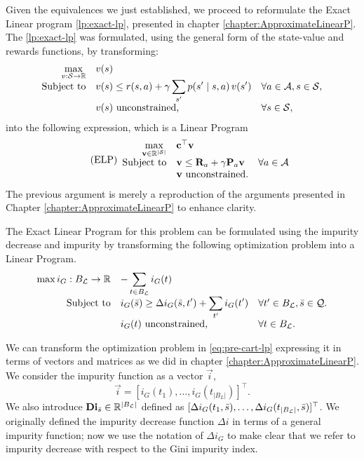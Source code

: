 Given the equivalences we just established, we proceed to reformulate the Exact
Linear program \eqref{lp:exact-lp}, presented in chapter
\ref{chapter:ApproximateLinearP}. The \eqref{lp:exact-lp} was formulated, using
the general form of the state-value and rewards functions, by transforming:
\begin{equation*}
\begin{array}{rl@{}ll}
    \displaystyle \max_{v: \States \to \R} & v(s) \\
    \text{Subject to} & \displaystyle v(s) \leq r(s,a) + \gamma \sum_{s'} p(s' \mid s, a) \, v(s') & \quad \forall a \in \Actions, s \in \States, \\
    & v(s) \text{ unconstrained,} & \quad \forall s \in \States,
\end{array}
\end{equation*}
into the following expression, which is a Linear Program
\begin{equation*}
\tag{ELP}
\begin{array}{rl@{}ll}
    \displaystyle \max_{\vec{v} \in \R^{|\States|}} & \vec{c}^{\top} \vec{v} \\
    \text{Subject to} & \vec{v} \leq \vec{R}_a + \gamma \vec{P}_a \vec{v} & \quad \forall a \in \Actions \\
    & \vec{v} \text{ unconstrained.} &
\end{array}
\end{equation*}
The previous argument is merely a reproduction of the arguments presented in
Chapter \ref{chapter:ApproximateLinearP} to enhance clarity.

The Exact Linear Program for this problem can be formulated using the impurity
decrease and impurity by transforming the following optimization problem into a
Linear Program.
\begin{equation}
\label{eq:pre-cart-lp}
\begin{array}{rl@{}ll}
    \displaystyle \max{i_G: B_\L \to \R} & \displaystyle - \sum_{t \in B_\L} i_{G}(t) \\
    \text{Subject to} & \displaystyle i_{G}(\bar{s}) \geq \Delta i_{G}(\bar{s}, t') + \sum_{t'} i_{G}(t') & \quad \forall t' \in B_\L, \bar{s} \in \mathcal{Q}. \\
    & i_{G}(t) \text{ unconstrained,} & \quad \forall t \in B_\L.
\end{array}
\end{equation}

We can transform the optimization problem in \eqref{eq:pre-cart-lp} expressing
it in terms of vectors and matrices as we did in chapter
\ref{chapter:ApproximateLinearP}. We consider the impurity function as a vector
$\vec{i}$,
\[
    \vec{i} = \left[ i_{G}(t_1), \dots, i_{G}(t_{|B_L|}) \right]^{\top}.  
\]
We also introduce $\mathbf{Di}_{\bar{s}} \in \mathbb{R}^{|B_{\mathcal{L}}|}$ defined as $[\Delta
i_{G}(t_1, \bar{s}), \dots, \Delta i_{G}(t_{|B_{\mathcal{L}}|}, \bar{s})]^{\top}$. We
originally defined the impurity decrease function $\Delta i$ in terms of a
general impurity function; now we use the notation of $\Delta i_{G}$ to make
clear that we refer to impurity decrease with respect to the Gini impurity
index.

